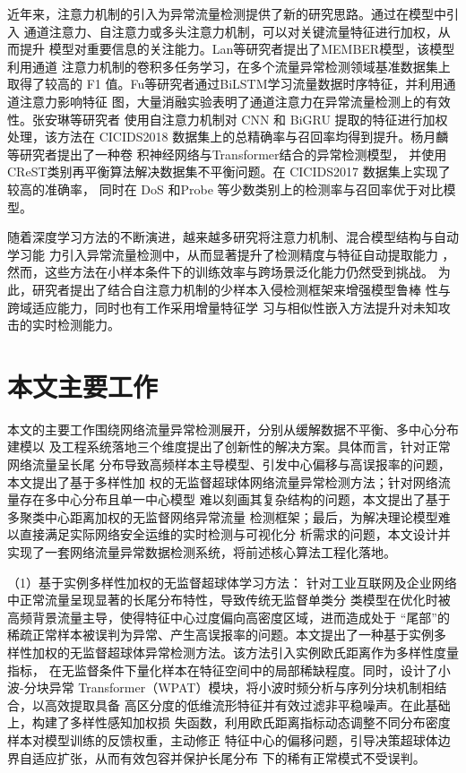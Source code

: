 近年来，注意力机制的引入为异常流量检测提供了新的研究思路。通过在模型中引入
通道注意力、自注意力或多头注意力机制，可以对关键流量特征进行加权，从而提升
模型对重要信息的关注能力。Lan等研究者提出了MEMBER模型\cite{lan2022member}，该模型利用通道
注意力机制的卷积多任务学习，在多个流量异常检测领域基准数据集上取得了较高的
F1 值。Fu等研究者通过BiLSTM学习流量数据时序特征，并利用通道注意力影响特征
图，大量消融实验表明了通道注意力在异常流量检测上的有效性\cite{fu2022deep}。张安琳等研究者
使用自注意力机制对 CNN 和 BiGRU 提取的特征进行加权处理\cite{张安琳2022基于}，该方法在
CICIDS2018 数据集上的总精确率与召回率均得到提升。杨月麟等研究者提出了一种卷
积神经网络与Transformer结合的异常检测模型\cite{杨月麟2021基于深度学习的网络流量异常检测}，
并使用CReST类别再平衡算法解决数据集不平衡问题。在 CICIDS2017 数据集上实现了较高的准确率，
同时在 DoS 和Probe 等少数类别上的检测率与召回率优于对比模型。

随着深度学习方法的不断演进，越来越多研究将注意力机制、混合模型结构与自动学习能
力引入异常流量检测中，从而显著提升了检测精度与特征自动提取能力
\cite{hozouri2025comprehensive}，然而，这些方法在小样本条件下的训练效率与跨场景泛化能力仍然受到挑战。
 为此，研究者提出了结合自注意力机制的少样本入侵检测框架来增强模型鲁棒
 性与跨域适应能力\cite{xu2025few}，同时也有工作采用增量特征学
 习与相似性嵌入方法提升对未知攻击的实时检测能力\cite{alitbi2025generalized}。

\section{本文主要工作}

本文的主要工作围绕网络流量异常检测展开，分别从缓解数据不平衡、多中心分布建模以
及工程系统落地三个维度提出了创新性的解决方案。具体而言，针对正常网络流量呈长尾
分布导致高频样本主导模型、引发中心偏移与高误报率的问题，本文提出了基于多样性加
权的无监督超球体网络流量异常检测方法；针对网络流量存在多中心分布且单一中心模型
难以刻画其复杂结构的问题，本文提出了基于多聚类中心距离加权的无监督网络异常流量
检测框架；最后，为解决理论模型难以直接满足实际网络安全运维的实时检测与可视化分
析需求的问题，本文设计并实现了一套网络流量异常数据检测系统，将前述核心算法工程化落地。

（1）基于实例多样性加权的无监督超球体学习方法：
针对工业互联网及企业网络中正常流量呈现显著的长尾分布特性，导致传统无监督单类分
类模型在优化时被高频背景流量主导，使得特征中心过度偏向高密度区域，进而造成处于
“尾部”的稀疏正常样本被误判为异常、产生高误报率的问题。本文提出了一种基于实例多
样性加权的无监督超球体异常检测方法。该方法引入实例欧氏距离作为多样性度量指标，
在无监督条件下量化样本在特征空间中的局部稀缺程度。同时，设计了小波-分块异常 
Transformer（WPAT）模块，将小波时频分析与序列分块机制相结合，以高效提取具备
高区分度的低维流形特征并有效过滤非平稳噪声。在此基础上，构建了多样性感知加权损
失函数，利用欧氏距离指标动态调整不同分布密度样本对模型训练的反馈权重，主动修正
特征中心的偏移问题，引导决策超球体边界自适应扩张，从而有效包容并保护长尾分布
下的稀有正常模式不受误判。

